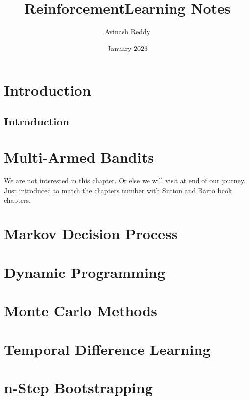 \documentclass{book}
\title{ReinforcementLearning Notes}
\author{Avinash Reddy}
\date{January 2023}
\begin{document}
\maketitle

\chapter{Introduction}
\section*{Introduction}



\chapter{Multi-Armed Bandits}
We are not interested in this chapter. Or else we will visit at end of our journey. Just introduced to match the chapters number with Sutton and Barto book chapters.

\chapter{Markov Decision Process}


\chapter{Dynamic Programming}


\chapter{Monte Carlo Methods}


\chapter{Temporal Difference Learning}


\chapter{n-Step Bootstrapping}



% 

% 
\end{document}
